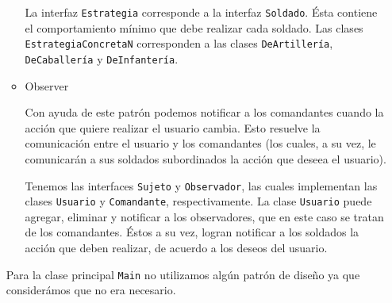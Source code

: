 \documentclass[letterpaper,11pt]{article}
\begin{document}
\begin{enumerate}
\begin{itemize}
        La interfaz \texttt{Estrategia} corresponde a la interfaz 
        \texttt{Soldado}. Ésta contiene el comportamiento mínimo que debe 
        realizar cada soldado. Las clases \texttt{EstrategiaConcretaN}
        corresponden a las clases \texttt{DeArtillería}, \texttt{DeCaballería}
        y \texttt{DeInfantería}. 

        \item Observer

        Con ayuda de este patrón podemos notificar a los comandantes cuando 
        la acción que quiere realizar el usuario cambia. Esto resuelve la 
        comunicación entre el usuario y los comandantes (los cuales, a su vez,
        le comunicarán a sus soldados subordinados la acción que deseea el 
        usuario).

        Tenemos las interfaces \texttt{Sujeto} y \texttt{Observador}, las cuales 
        implementan las clases \texttt{Usuario} y \texttt{Comandante}, 
        respectivamente. La clase \texttt{Usuario} puede agregar, eliminar y 
        notificar a los observadores, que en este caso se tratan de los 
        comandantes. Éstos a su vez, logran notificar a los soldados la acción 
        que deben realizar, de acuerdo a los deseos del usuario.
    \end{itemize}

    Para la clase principal \texttt{Main} no utilizamos algún patrón de diseño 
    ya que considerámos que no era necesario.
\end{enumerate}
\end{document}
